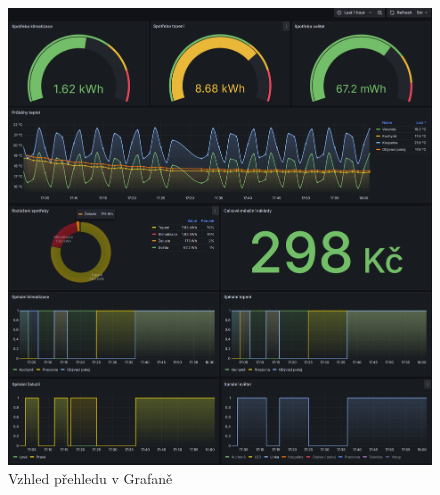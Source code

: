 \begin{figure}[!ht]
  \begin{center}
  \includegraphics[scale=0.37]{obrazky/Grafana.png}
  \end{center}
  \caption[Vzhled přehledu v Grafaně]{Vzhled přehledu v Grafaně}
  \label{fig:GrafanaDashboard}
\end{figure}